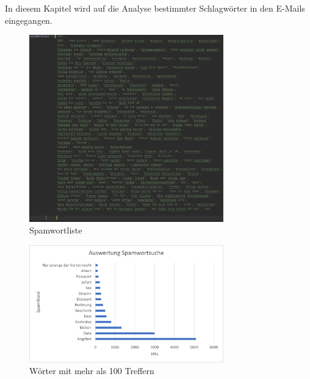 In diesem Kapitel wird auf die Analyse bestimmter Schlagwörter in den E-Mails eingegangen.







\begin{figure}
    \centering
    \includegraphics[width=0.75\textwidth]{images/Spamwortliste.PNG}
    \caption{Spamwortliste} 
    \label{fig:spamwortliste}
\end{figure}


\begin{figure}
    \centering
    \includegraphics[width=0.75\textwidth]{images/Auswertung_Spamwortsuche.png}
    \caption{Wörter mit mehr als 100 Treffern} 
    \label{fig:spamwortlistegreater100}
\end{figure}
